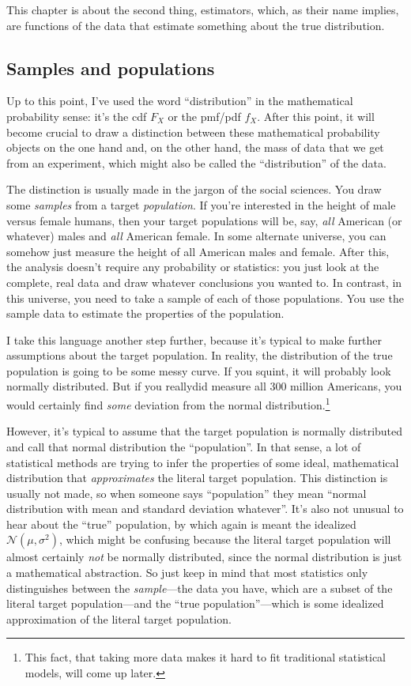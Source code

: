 This chapter is about the second thing, estimators, which, as their name
implies, are functions of the data that estimate something about the true
distribution.

\subsection{Samples and populations}

Up to this point, I've used the word ``distribution'' in the mathematical
probability sense: it's the cdf $F_X$ or the pmf/pdf $f_X$. After this point,
it will become crucial to draw a distinction between these mathematical
probability objects on the one hand and, on the other hand, the mass of data
that we get from an experiment, which might also be called the ``distribution''
of the data.

The distinction is usually made in the jargon of the social sciences. You draw
some \emph{samples} from a target \emph{population}. If you're interested in
the height of male versus female humans, then your target populations will be,
say, \emph{all} American (or whatever) males and \emph{all} American female.
In some alternate universe, you can somehow just measure the height of all
American males and female. After this, the analysis doesn't require any
probability or statistics: you just look at the complete, real data and draw
whatever conclusions you wanted to. In contrast, in this universe, you need to
take a sample of each of those populations. You use the sample data to
estimate the properties of the population.

I take this language another step further, because it's typical to make
further assumptions about the target population. In reality, the distribution
of the true population is going to be some messy curve. If you squint, it will
probably look normally distributed. But if you reallydid measure all 300 million
Americans, you would certainly find \emph{some} deviation from the normal
distribution.\footnote{This fact, that taking more data makes it hard to fit
traditional statistical models, will come up later.}

However, it's typical to assume that the target population is normally
distributed and call that normal distribution the ``population''. In that
sense, a lot of statistical methods are trying to infer the properties of some
ideal, mathematical distribution that \emph{approximates} the literal target
population. This distinction is usually not made, so when someone says
``population'' they mean ``normal distribution with mean and standard
deviation whatever''. It's also not unusual to hear about the ``true''
population, by which again is meant the idealized $\mathcal{N}(\mu,
\sigma^2)$, which might be confusing because the literal target population
will almost certainly \emph{not} be normally distributed, since the normal
distribution is just a mathematical abstraction. So just keep in mind that
most statistics only distinguishes between the \emph{sample}---the data you
have, which are a subset of the literal target population---and the ``true
population''---which is some idealized approximation of the literal target
population.

